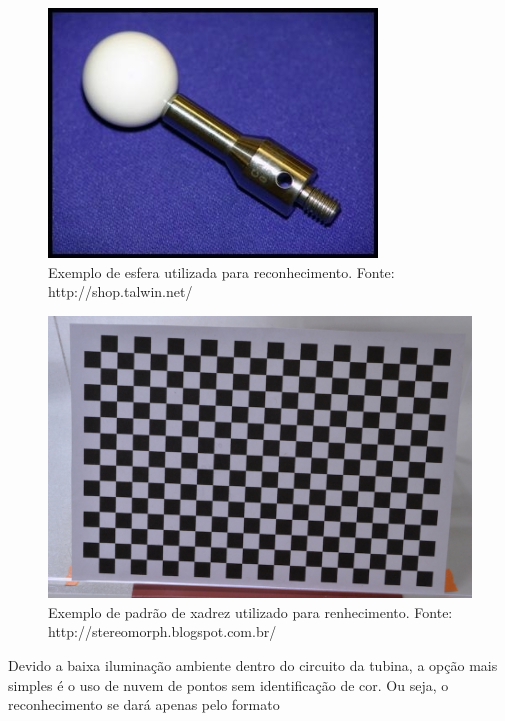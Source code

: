 \begin{figure}[h!]
   \centering
   \includegraphics[width=0.95\columnwidth]{figs/localizacao/sphere_rec}
   \caption{Exemplo de esfera utilizada para reconhecimento. Fonte:
   http://shop.talwin.net/}
   \label{fig::sphere_rec}
\end{figure}



\begin{figure}[h!]
   \centering
   \includegraphics[width=0.95\columnwidth]{figs/localizacao/checkerboard_rec}
   \caption{Exemplo de padrão de xadrez utilizado para renhecimento. Fonte:
   http://stereomorph.blogspot.com.br/}
   \label{fig::checkerboard_rec}
\end{figure}


Devido a baixa iluminação ambiente dentro do circuito da tubina, a opção
mais simples é o uso de nuvem de pontos sem identificação de cor. Ou seja, o
reconhecimento se dará apenas pelo formato 


